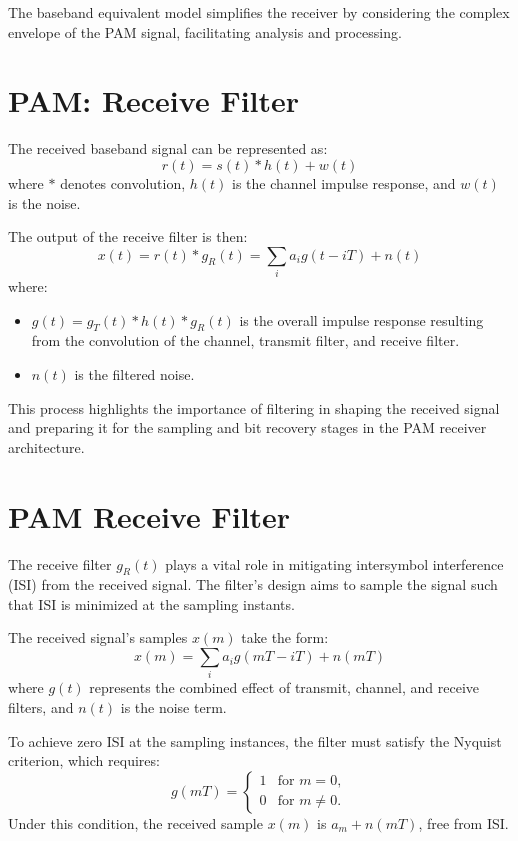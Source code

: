 The baseband equivalent model simplifies the receiver by considering the complex envelope of the PAM signal, facilitating analysis and processing.

\section*{PAM: Receive Filter}

The received baseband signal can be represented as:
\[ r(t) = s(t) * h(t) + w(t) \]
where \( * \) denotes convolution, \( h(t) \) is the channel impulse response, and \( w(t) \) is the noise.

The output of the receive filter is then:
\[ x(t) = r(t) * g_R(t) = \sum_i a_i g(t - iT) + n(t) \]
where:
\begin{itemize}
    \item \( g(t) = g_T(t) * h(t) * g_R(t) \) is the overall impulse response resulting from the convolution of the channel, transmit filter, and receive filter.
    \item \( n(t) \) is the filtered noise.
\end{itemize}

This process highlights the importance of filtering in shaping the received signal and preparing it for the sampling and bit recovery stages in the PAM receiver architecture.


\section*{PAM Receive Filter}

The receive filter \( g_R(t) \) plays a vital role in mitigating intersymbol interference (ISI) from the received signal. The filter's design aims to sample the signal such that ISI is minimized at the sampling instants.

The received signal's samples \( x(m) \) take the form:
\[ x(m) = \sum_i a_i g(mT - iT) + n(mT) \]
where \( g(t) \) represents the combined effect of transmit, channel, and receive filters, and \( n(t) \) is the noise term.

To achieve zero ISI at the sampling instances, the filter must satisfy the Nyquist criterion, which requires:
\[ g(mT) =
\begin{cases}
1 & \text{for } m = 0, \\
0 & \text{for } m \neq 0.
\end{cases} \]
Under this condition, the received sample \( x(m) \) is \( a_m + n(mT) \), free from ISI.

